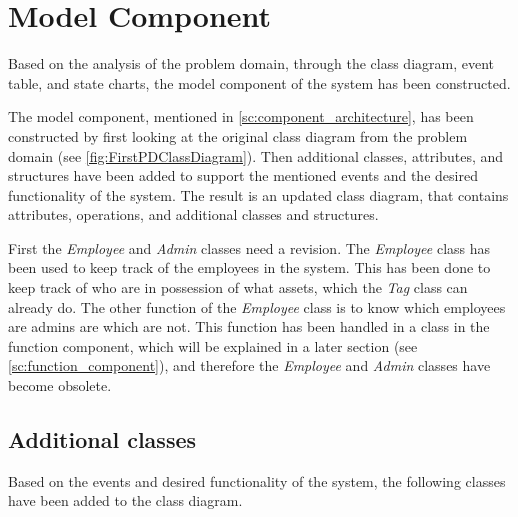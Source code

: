 \section{Model Component} \label{sc:model_component}
Based on the analysis of the problem domain, through the class diagram, event table, and state charts, the model component of the system has been constructed.
\par
The model component, mentioned in \autoref{sc:component_architecture}, has been constructed by first looking at the original class diagram from the problem domain (see \autoref{fig:FirstPDClassDiagram}). Then additional classes, attributes, and structures have been added to support the mentioned events and the desired functionality of the system. The result is an updated class diagram, that contains attributes, operations, and additional classes and structures.
\par
First the \textit{Employee} and \textit{Admin} classes need a revision. The \textit{Employee} class has been used to keep track of the employees in the system. This has been done to keep track of who are in possession of what assets, which the \textit{Tag} class can already do. The other function of the \textit{Employee} class is to know which employees are admins are which are not. This function has been handled in a class in the function component, which will be explained in a later section (see \autoref{sc:function_component}), and therefore the \textit{Employee} and \textit{Admin} classes have become obsolete.

\subsection{Additional classes}
Based on the events and desired functionality of the system, the following classes have been added to the class diagram. 


